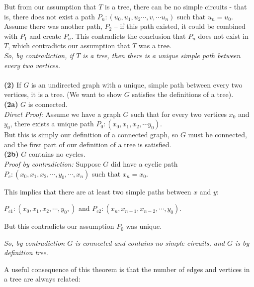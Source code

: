 \documentclass[a4paper,10pt]{report}
\begin{document}
But from our assumption that $T$ is a tree, there can be no simple circuits - that is, there does not exist a path $P_n:(u_0, u_1, u_2\cdots,v,\cdots u_n)$ such that $u_n = u_0$.\\

Assume there was another path, $P_2$ -- if this path existed, it could be combined with $P_1$ and create $P_n$. This contradicts the conclusion that $P_n$ does not exist in $T$, which contradicts our assumption that $T$ was a tree.\\

\textit{So, by contradiction, if $T$ is a tree, then there is a unique simple path between every two vertices.} \\ \\

\textbf{(2)} If $G$ is an undirected graph with a unique, simple path between every two vertices, it is a tree. (We want to show $G$ satisfies the definitions of a tree). \\

\textbf{(2a)} $G$ is connected.\\
\textit{Direct Proof:}
Assume we have a graph $G$ such that for every two vertices $x_0$ and $y_0$, there exists a unique path $P_0:(x_0, x_1, x_2,\cdots y_0)$. \\

But this is simply our definition of a connected graph, so $G$ must be connected, and the first part of our definition of a tree is satisfied. \\

\textbf{(2b)} $G$ contains no cycles.\\

\textit{Proof by contradiction:}
Suppose $G$ did have a cyclic path $P_c:(x_0, x_1, x_2,\cdots,y_0,\cdots,x_n)$ such that $x_n = x_0$.

This implies that there are at least two simple paths between $x$ and $y$:

$P_{c1}:(x_0, x_1, x_2,\cdots,y_0,)$ and
$P_{c2}:(x_n, x_{n-1}, x_{n-2},\cdots,y_0)$.

But this contradicts our assumption $P_0$ was unique.

\textit{So, by contradiction $G$ is connected and contains no simple circuits, and $G$ is by definition tree.}

\hrulefill






A useful consequence of this theorem is that the number of edges and vertices in a tree are always related:
\end{document}

